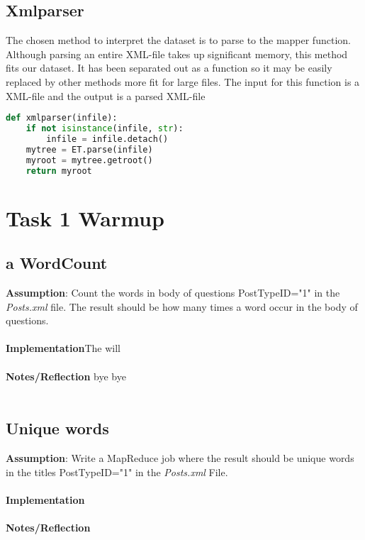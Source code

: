 \documentclass[fleqn,10pt]{wlscirep}
\begin{document}
\subsection{Xmlparser}
The chosen method to interpret the dataset is to parse to the mapper function. Although parsing an entire XML-file takes up significant memory, this method fits our dataset. It has been separated out as a function so it may be easily replaced by other methods more fit for large files. The input for this function is a XML-file and the output is a parsed XML-file 

\begin{lstlisting}[language=Python, caption=xmlparser function]
def xmlparser(infile):
    if not isinstance(infile, str):
        infile = infile.detach()
    mytree = ET.parse(infile)
    myroot = mytree.getroot()
    return myroot
\end{lstlisting}
\section{Task 1 Warmup}
\subsection{a WordCount}
\textbf{Assumption}: Count the words in body of questions PostTypeID="1"  in the \textit{Posts.xml}  file. The result should be how many times a word occur in the body of questions.\\ \\
\textbf{Implementation}The will  \\ \\
\textbf{Notes/Reflection} bye bye  \\ \\



\subsection{Unique words}
\textbf{Assumption}: Write a MapReduce job where the result should be unique words in the titles PostTypeID="1" in the \textit{Posts.xml} File. \\ \\
\textbf{Implementation}  \\ \\
\textbf{Notes/Reflection}

\end{document}
